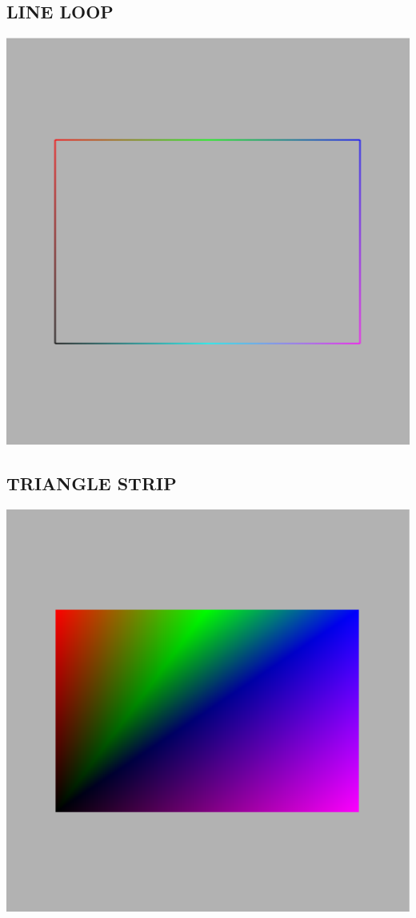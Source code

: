 \documentclass{report}
\begin{document}
\subsection{LINE LOOP}
\includegraphics[width=1.0\textwidth]{Image_2}
\subsection{TRIANGLE STRIP}
\includegraphics[width=1.0\textwidth]{Image_3}
\end{document}
